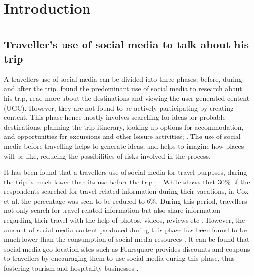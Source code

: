 \section{Introduction}



\section{}

\subsection{Traveller's use of social media to talk about his trip}


A traveller\textquotesingle s use of social media can be divided into three phases: before, during and after the trip. \cite{cox2009role} found the predominant use of social media to research about his trip, read more about the destinations and viewing the user generated content (UGC). However, they are not found to be actively participating by creating content. This phase hence mostly involves searching for ideas for probable destinations, planning the trip itinerary, looking up options for accommodation, and opportunities for excursions and other leisure activities\cite{cox2009role}; \cite{fotis2012social}. The use of social media before travelling helps to generate ideas, and helps to imagine how places will be like, reducing the possibilities of risks involved in the process.

It has been found that a traveller\textquotesingle s use of social media for travel purposes, during the trip is much lower than its use before the trip \cite{cox2009role}; \cite{fotis2012social}. While \cite{fotis2012social} shows that 30\% of the respondents searched for travel-related information during their vacations, in Cox et al.\cite{cox2009role} the percentage was seen to be reduced to 6\%. During this period, travellers not only search for travel-related information but also share information regarding their travel with the help of photos, videos, reviews etc \cite{Text100, 2013}. However, the amount of social media content produced during this phase has been found to be much lower than the consumption of social media resources \cite{fotis2012social}. It can be found that social media geo-location sites such as Foursquare provides discounts and coupons to travellers by encouraging them to use social media during this phase, thus fostering tourism and hospitality businesses \cite{hudson2013impact}.

